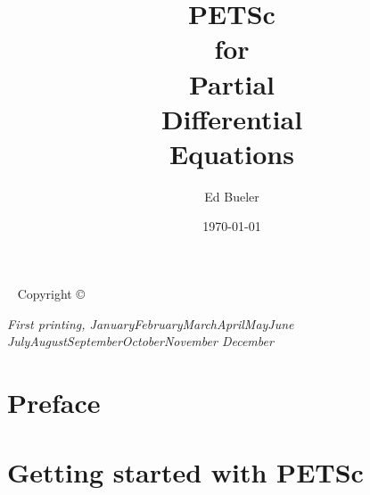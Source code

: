 \documentclass{tufte-book}
\title[PETSc for PDEs]{PETSc \\ for \\ Partial \\ Differential \\ Equations}
\author{Ed Bueler}
\date{\today}
\newcommand{\CODELOC}{}  %
\theoremstyle{definition}
\newcommand{\openepigraph}[2]{%
  \begin{fullwidth}
  \sffamily\large
  \begin{doublespace}
  \noindent\allcaps{#1}\\%
  \noindent \Large \allcaps{#2}%
  \end{doublespace}
  \end{fullwidth}
}
\newcommand{\monthyear}{%
  \ifcase\month\or January\or February\or March\or April\or May\or June\or
  July\or August\or September\or October\or November\or
  December\fi\space\number\year
}
\begin{document}
\begin{comment}
\newpage\thispagestyle{empty}
\openepigraph{%
\dots when there are disputes among persons, we can simply say: Let us calculate, without further ado, to see who is right.
}{Gottfried Wilhelm Leibniz}
\vfill
\openepigraph{%
Developing parallel, nontrivial PDE solvers that deliver high performance is still difficult and requires months (or even years) of concentrated effort.  PETSc is a toolkit that can ease these difficulties and reduce the development time, but it is not a black-box PDE solver, nor a silver bullet
}{Barry Smith}
\vfill
\openepigraph{%
Tufte's style is known for its extensive use of sidenotes, tight integration of graphics with text, and well-set typography.
}{The Tufte-LaTeX\ Developers}
\vfill

\frontmatter
\end{comment}

\maketitle


\newpage
\begin{fullwidth}
~\vfill
\thispagestyle{empty}
\setlength{\parindent}{0pt}
\setlength{\parskip}{\baselineskip}
Copyright \copyright\ \the\year\ \thanklessauthor

\par{}


\par\textit{First printing, \monthyear}
\end{fullwidth}

\tableofcontents




\chapter*{Preface}


\mainmatter


\chapter{Getting started with PETSc}
\label{chap:gs}
\renewcommand{\CODELOC}{ch1/}

\end{document}
